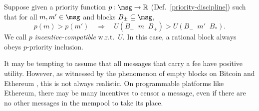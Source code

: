 \documentclass[a4paper,11pt]{article}
\newcommand \cat {\mathop{|\!|}}
\begin{document}
\begin{example}
\label{priority-inclusion-rational}

  Suppose given a priority function $p:\msg\rightarrow\R$ (Def.~\ref{priority-discipline}) such that for all $m,m'\in\msg$ and blocks $B_\pm\subseteq\msg$,
  \[
    p(m) > p(m') \quad \Rightarrow \quad U(B_-\cat m\cat B_+) > U(B_-\cat m'\cat B_*).
  \]
  We call $p$ \emph{incentive-compatible} w.r.t.~$U$.
  In this case, a rational block always obeys $p$-priority inclusion.

\end{example}

\begin{remark}
  
  It may be tempting to assume that all messages that carry a fee have positive utility.
  However, as witnessed by the phenomenon of empty blocks on Bitcoin and Ethereum \cite{gauthier2016why,silva2020impact}, this is not always realistic.
  On programmable platforms like Ethereum, there may be many incentives to censor a message, even if there are no other messages in the mempool to take its place.

\end{remark}
\end{document}
